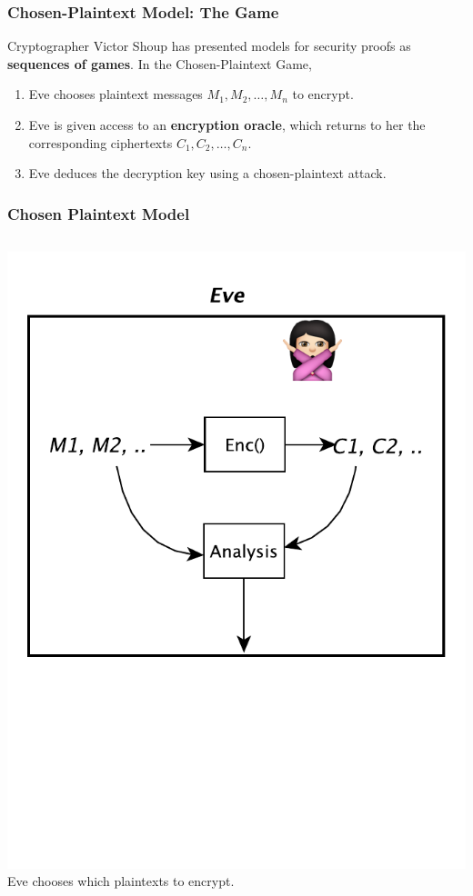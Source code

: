 \documentclass{beamer}
\newcommand{\<}{\langle}
\renewcommand{\>}{\rangle}
\begin{document}
\begin{frame}
\frametitle{Chosen-Plaintext Model: The Game}

Cryptographer Victor Shoup has presented models for security proofs as \textbf{sequences of games}. In the Chosen-Plaintext Game,
\begin{enumerate}
\item Eve chooses plaintext messages $M_1, M_2,\dots, M_n$ to encrypt.
\item Eve is given access to an \textbf{encryption oracle}, which returns to her the corresponding ciphertexts $C_1, C_2, \dots, C_n$. 
\item Eve deduces the decryption key using a chosen-plaintext attack.
\end{enumerate}
\end{frame}

\begin{frame}
\frametitle{Chosen Plaintext Model}
\begin{columns}
\centering
\includegraphics[scale=.5]{IMG/attack2half.pdf}
Eve chooses which plaintexts to encrypt. 
\end{columns} 
\end{frame}
\end{document}
